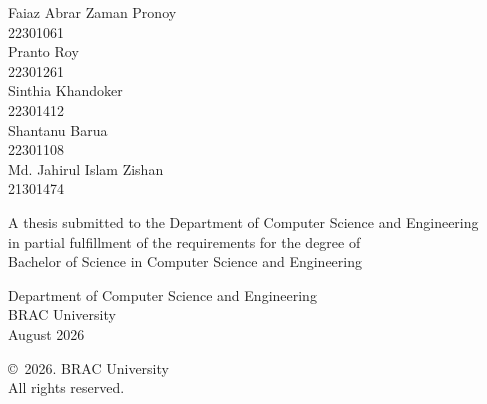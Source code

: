\begin{titlepage}
\renewcommand*{\thepage}{Title}

    \begin{center}
        \vspace*{3cm}

        {\fontsize{16pt}{22pt}\selectfont{TriLens-MoE-Stack: A Multi-View Hybrid Framework for Lineage-Aware Multi-Drug Antibiotic Resistance Prediction in Escherichia coli Using Genomic Data}
        }

        \vspace{1.5cm}


        \vspace{0.5cm}

        	Faiaz Abrar Zaman Pronoy\\
	        22301061\\
	        Pranto Roy\\
	        22301261\\
	        Sinthia Khandoker\\
	        22301412\\
	        Shantanu Barua\\
	        22301108\\
            Md. Jahirul Islam Zishan\\
            21301474

        \vspace{1.5cm}

        	A thesis submitted to the Department of Computer Science and Engineering\\
            in partial fulfillment of the requirements for the degree of\\
            Bachelor of Science in Computer Science and Engineering

        \vspace{2.5cm}

    		Department of Computer Science and Engineering\\
            BRAC University\\
            August 2026

        \vspace{3cm}

    		\copyright\ 2026. BRAC University\\
            All rights reserved.

    \end{center}

\end{titlepage}
